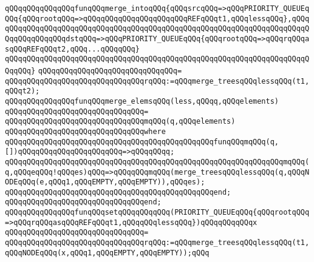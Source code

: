 \newline
\newline
\verb|qQQqqQQqqQQqqQQqfunqQQqmerge_intoqQQq{qQQqsrcqQQq=>qQQqPRIORITY_QUEUEqQQq{qQQqrootqQQq=>qQQqqQQqqQQqqQQqqQQqqQQqREFqQQqt1,qQQqlessqQQq},qQQq|\newline
\verb|qQQqqQQqqQQqqQQqqQQqqQQqqQQqqQQqqQQqqQQqqQQqqQQqqQQqqQQqqQQqqQQqqQQqqQQqqQQqqQQqqQQqdstqQQq=>qQQqPRIORITY_QUEUEqQQq{qQQqrootqQQq=>qQQqrqQQqasqQQqREFqQQqt2,qQQq...qQQqqQQq}|\newline
\verb|qQQqqQQqqQQqqQQqqQQqqQQqqQQqqQQqqQQqqQQqqQQqqQQqqQQqqQQqqQQqqQQqqQQqqQQqqQQq}|\newline
\verb|qQQqqQQqqQQqqQQqqQQqqQQqqQQqqQQq=|\newline
\verb|qQQqqQQqqQQqqQQqqQQqqQQqqQQqqQQqrqQQq:=qQQqmerge_treesqQQqlessqQQq(t1,qQQqt2);|\newline
\newline
\newline
\verb|qQQqqQQqqQQqqQQqfunqQQqmerge_elemsqQQq(less,qQQqq,qQQqelements)|\newline
\verb|qQQqqQQqqQQqqQQqqQQqqQQqqQQqqQQq=|\newline
\verb|qQQqqQQqqQQqqQQqqQQqqQQqqQQqqQQqmqQQq(q,qQQqelements)|\newline
\verb|qQQqqQQqqQQqqQQqqQQqqQQqqQQqqQQqwhere|\newline
\verb|qQQqqQQqqQQqqQQqqQQqqQQqqQQqqQQqqQQqqQQqqQQqqQQqfunqQQqmqQQq(q,[])qQQqqQQqqQQqqQQqqQQqqQQq=>qQQqqQQqq;|\newline
\verb|qQQqqQQqqQQqqQQqqQQqqQQqqQQqqQQqqQQqqQQqqQQqqQQqqQQqqQQqqQQqqQQqmqQQq(q,qQQqeqQQq!qQQqes)qQQq=>qQQqqQQqmqQQq(merge_treesqQQqlessqQQq(q,qQQqNODEqQQq(e,qQQq1,qQQqEMPTY,qQQqEMPTY)),qQQqes);|\newline
\verb|qQQqqQQqqQQqqQQqqQQqqQQqqQQqqQQqqQQqqQQqqQQqqQQqend;|\newline
\verb|qQQqqQQqqQQqqQQqqQQqqQQqqQQqqQQqend;|\newline
\newline
\newline
\verb|qQQqqQQqqQQqqQQqfunqQQqsetqQQqqQQqqQQq(PRIORITY_QUEUEqQQq{qQQqrootqQQq=>qQQqrqQQqasqQQqREFqQQqt1,qQQqqQQqlessqQQq})qQQqqQQqqQQqx|\newline
\verb|qQQqqQQqqQQqqQQqqQQqqQQqqQQqqQQq=|\newline
\verb|qQQqqQQqqQQqqQQqqQQqqQQqqQQqqQQqrqQQq:=qQQqmerge_treesqQQqlessqQQq(t1,qQQqNODEqQQq(x,qQQq1,qQQqEMPTY,qQQqEMPTY));qQQq|\newline
\newline
\newline
